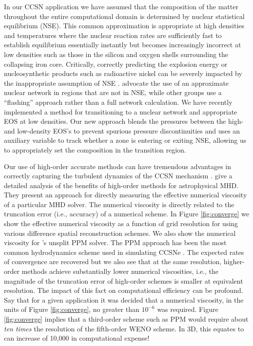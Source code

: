 In our \flash CCSN application we have assumed that the composition of the matter throughout the entire computational domain is determined by nuclear statistical equilibrium (NSE).
This common approximation \citep[e.g.,][]{Burrows:2007, Ott:2008, Dolence:2015, Skinner:2016, Roberts:2016, Kuroda:2016} is appropriate at high densities and temperatures where the nuclear reaction rates are sufficiently fast to establish equilibrium essentially instantly but becomes increasingly incorrect at low densities such as those in the silicon and oxygen shells surrounding the collapsing iron core.
Critically, correctly predicting the explosion energy or nucleosynthetic products such as radioactive nickel can be severely impacted by the inappropriate assumption of NSE \citep{Bruenn:2016}.
\citet{Bruenn:2016} advocate the use of an approximate nuclear network in regions that are not in NSE, while other groups \citep[e.g.,][]{Muller:2012a, Melson:2015} use a ``flashing'' approach rather than a full network calculation.
We have recently implemented a method for transitioning to a nuclear network and appropriate EOS at low densities.
Our new approach blends the pressures between the high- and low-density EOS's to prevent spurious pressure discontinuities and uses an auxiliary variable to track whether a zone is entering or exiting NSE, allowing us to appropriately set the composition in the transition region.

Our use of high-order accurate methods can have tremendous advantages in correctly capturing the turbulent dynamics of the CCSN mechanism \citep{Radice:2015}.
\citet{Rembiasz:2016} give a detailed analysis of the benefits of high-order methods for astrophysical MHD.
They present an approach for directly measuring the effective numerical viscosity of a particular MHD solver.
The numerical viscosity is directly related to the truncation error (i.e., accuracy) of a numerical scheme.
In Figure \ref{fig:converge} we show the effective numerical viscosity as a function of grid resolution for \spark using various difference spatial reconstruction schemes.
We also show the numerical viscosity for \flash's unsplit PPM solver.
The PPM approach \citep{Colella:1984} has been the most common hydrodynamics scheme used in simulating CCSNe  \citep[e.g.,][]{Fryxell:1991, Janka:1995, Rampp:2000, Blondin:2003, Nordhaus:2010, Couch:2013a, Dolence:2015, Lentz:2015, Muller:2012a}.
The expected rates of convergence are recovered but we also see that at the same resolution, higher-order methods achieve substantially lower numerical viscosities, i.e., the magnitude of the truncation error of high-order schemes is smaller at equivalent resolution.
The impact of this fact on computational efficiency can be profound.
Say that for a given application it was decided that a numerical viscosity, in the units of Figure \ref{fig:converge}, no greater than $10^{-6}$ was required.
Figure \ref{fig:converge} implies that a third-order scheme such as PPM would require about {\it ten times} the resolution of the fifth-order WENO scheme.
In 3D, this equates to can increase of 10,000 in computational expense!

